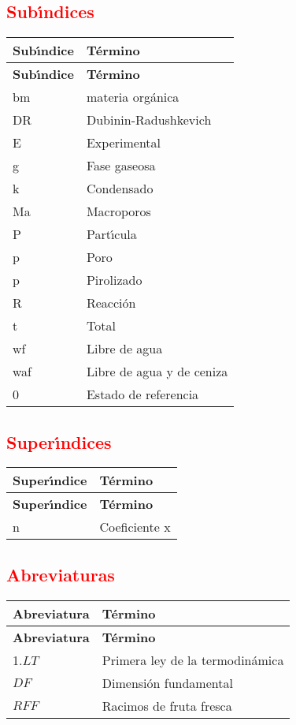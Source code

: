 \textcolor{red}{
\section*{Sub\'{\i}ndices}
\begin{longtable}[l]{>{}l<{}l}
  \textbf{Sub\'{\i}ndice} & \textbf{T\'{e}rmino} \\[0.5ex] \hline%
  \endfirsthead%
  \textbf{Sub\'{\i}ndice} & \textbf{T\'{e}rmino} \\[0.5ex] \hline%
  \endhead%
\renewcommand{\arraystretch}{1.4}\label{simbolosg}
 bm&materia org\'{a}nica\\%
 DR&Dubinin-Radushkevich\\%
 E&Experimental\\%
 g&Fase gaseosa\\%
 k&Condensado\\%
 Ma&Macroporos\\%
 P&Part\'{\i}cula\\%
 p&Poro\\%
 p&Pirolizado\\%
 R&Reacci\'{o}n\\%
 t&Total\\%
 wf&Libre de agua\\%
 waf&Libre de agua y de ceniza\\%
 0&Estado de referencia\\%
\end{longtable}
}

\setlength{\extrarowheight}{0pt}

\textcolor{red}{
\section*{Super\'{\i}ndices}
\begin{longtable}[l]{>{}l<{}l}
  \textbf{Super\'{\i}ndice} & \textbf{T\'{e}rmino} \\[0.5ex] \hline%
  \endfirsthead%
  \textbf{Super\'{\i}ndice} & \textbf{T\'{e}rmino} \\[0.5ex] \hline%
  \endhead%
\renewcommand{\arraystretch}{1.4}\label{simbolosg}
 n &Coeficiente x\\%
\end{longtable}
}

\setlength{\extrarowheight}{0pt}

\textcolor{red}{
\section*{Abreviaturas}
\begin{longtable}[l]{>{}l<{}l}
  \textbf{Abreviatura} & \textbf{T\'{e}rmino} \\[0.5ex] \hline%
  \endfirsthead%
  \textbf{Abreviatura} & \textbf{T\'{e}rmino} \\[0.5ex] \hline%
  \endhead%
\renewcommand{\arraystretch}{1.4}\label{simbolosg}
 1.$LT$&Primera ley de la termodin\'{a}mica\\%
 $DF$    &Dimensi\'{o}n fundamental\\%
 $RFF$   &Racimos de fruta fresca\\%
\end{longtable}
}

\setlength{\extrarowheight}{0pt}